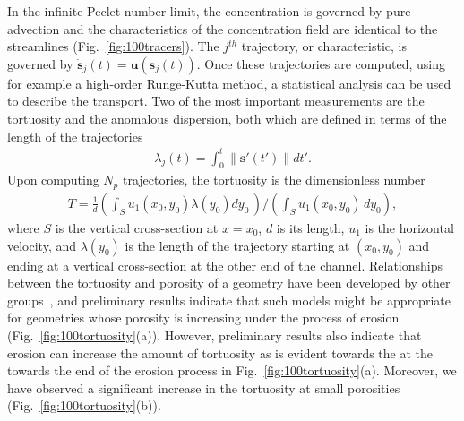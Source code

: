 \documentclass[11pt]{article}
\newcommand{\bvec}[1]{{\mathbf{#1}}}
\newcommand{\uu}{\bvec{u}}
\renewcommand{\ss}{{\mathbf{s}}}
\begin{document}
In the infinite Peclet number limit, the concentration is governed by pure advection and the characteristics of the concentration field are identical to the streamlines (Fig.~\ref{fig:100tracers}). The $j^{th}$ trajectory, or characteristic, is governed by $\dot{\ss}_j(t) = \uu(\ss_j(t))$. Once these trajectories are computed, using for example a high-order Runge-Kutta method, a statistical analysis can be used to describe the transport. Two of the most important measurements are the tortuosity and the anomalous dispersion, both which are defined in terms of the length of the trajectories
\begin{align} 
  \lambda_j(t) = \int_{0}^{t} \|\ss'(t')\| dt'.
\end{align}
Upon computing $N_p$ trajectories, the tortuosity is the dimensionless number
\begin{align}
  T = \frac{1}{d} \left(\int_{S} u_1(x_0,y_0)\lambda(y_0) dy_0\, \right)
  \Bigg/ \left(\int_S u_1(x_0,y_0)\, dy_0 \right),
\end{align}
where $S$ is the vertical cross-section at $x=x_0$, $d$ is its length,
$u_1$ is the horizontal velocity, and $\lambda(y_0)$ is the length of
the trajectory starting at $(x_0,y_0)$ and ending at a vertical
cross-section at the other end of the channel. Relationships between the
tortuosity and porosity of a geometry have been developed by other
groups~\cite{kop-kat-tim1996, dud-koz-mat2011, mat-kha-koz2008}, and
preliminary results indicate that such models might be appropriate for
geometries whose porosity is increasing under the process of erosion
(Fig.~\ref{fig:100tortuosity}(a)). However, preliminary results also
indicate that erosion can increase the amount of tortuosity as is
evident towards the at the towards the end of the erosion process in
Fig.~\ref{fig:100tortuosity}(a). Moreover, we have observed a
significant increase in the tortuosity at small porosities
(Fig.~\ref{fig:100tortuosity}(b)).
\end{document}

